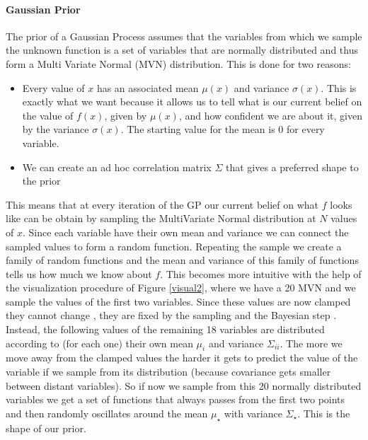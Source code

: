 \documentclass{article}
\begin{document}
\paragraph{Gaussian Prior}
The prior of a Gaussian Process assumes that the variables from which we sample the unknown function is a set of variables that are normally distributed and thus form a Multi Variate Normal (MVN) distribution. This is done for two reasons:
\begin{itemize}
    \item Every value of $x$ has an associated mean $\mu(x)$ and variance $\sigma(x)$. This is exactly what we want because it allows us to tell what is our current belief on the value of $f(x)$, given by $\mu(x)$, and how confident we are about it, given by the variance $\sigma(x)$. The starting value for the mean is 0 for every variable. 
    \item We can create an ad hoc correlation matrix $\Sigma$ that gives a preferred shape to the prior
\end{itemize}
This means that at every iteration of the GP our current belief on what $f$ looks like can be obtain by sampling the MultiVariate Normal distribution at $N$ values of $x$. Since each variable have their own mean and variance we can connect the sampled values to form a random function. Repeating the sample we create a family of random functions and the mean and variance of this family of functions tells us how much we know about $f$. This becomes more intuitive with the help of the visualization procedure of Figure \ref{visual2}, where we have a 20 MVN and we sample the values of the first two variables. Since these values are now clamped they cannot change , they are fixed by the sampling and the Bayesian step
. Instead, the following values of the remaining 18 variables are distributed according to (for each one) their own mean $\mu_i$ and variance $\Sigma_{ii}$. The more we move away from the clamped values the harder it gets to predict the value of the variable if we sample from its distribution (because covariance gets smaller between distant variables). So if now we sample from this 20 normally distributed variables we get a set of functions that always passes from the first two points and then randomly oscillates around the mean $\mu_\star$ with variance $\Sigma_\star$. This is the shape of our prior. 
\end{document}

